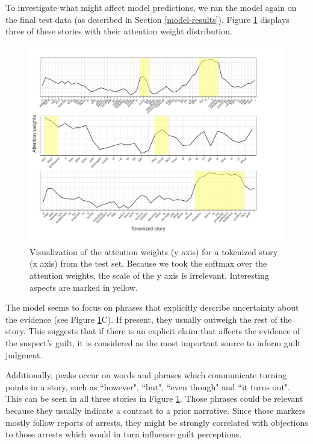 \documentclass[11pt,a4paper]{article}
\begin{document}
To investigate what might affect model predictions, we ran the model again on the final test data (as described in Section \ref{model-results}). Figure \ref{fig:viz} displays three of these stories with their attention weight distribution.

\begin{figure}
	\includegraphics[width=\linewidth]{graphs/attention-marked.pdf}
	\caption{Visualization of the attention weights (y axis) for a tokenized story (x axis) from the test set. Because we took the softmax over the attention weights, the scale of the y axis is irrelevant. Interesting aspects are marked in yellow.}
	\label{fig:viz}
\end{figure}

The model seems to focus on phrases that explicitly describe uncertainty about the evidence (see Figure \ref{fig:viz}C). If present, they usually outweigh the rest of the story. This suggests that if there is an explicit claim that affects the evidence of the suspect's guilt, it is considered as the most important source to inform guilt judgment.

Additionally, peaks occur on words and phrases which communicate turning points in a story, such as ``however", ``but", ``even though" and ``it turns out". This can be seen in all three stories in Figure \ref{fig:viz}. Those phrases could be relevant because they usually indicate a contrast to a prior narrative. Since those markers mostly follow reports of arrests, they might be strongly correlated with objections to those arrests which would in turn influence guilt perceptions.
\end{document}
